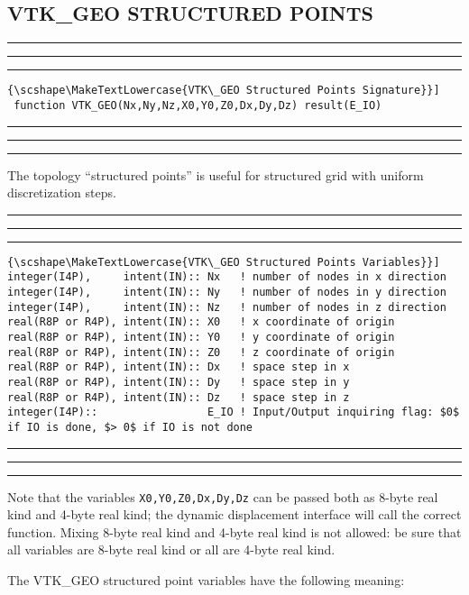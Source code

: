 \documentclass[pagesize=pdftex,fontsize=10pt,paper=a4,oneside]{scrbook}
\DeclareRobustCommand{\MarginNote}[1]{\marginpar{%
\slshape\footnotesize%
\parindent=0pt\lineskip=0pt\lineskiplimit=0pt%
\tolerance=2000\hyphenpenalty=300\exhyphenpenalty=300%
\doublehyphendemerits=100000\finalhyphendemerits=\doublehyphendemerits%
\raggedright\hspace{0pt}#1}}
\newenvironment{boxred}[1]%
               {%
                \noindent\hspace*{-0.025\textwidth}%
                \color{Maroon}%
                \rule[-5.8pt]{0.6pt}{6pt}\hspace*{-0.6pt}\rule{1.05\textwidth}{0.6pt}\hspace*{-0.6pt}\rule[-5.8pt]{0.6pt}{6pt}%
                \color{black}%
                \vspace*{0.6pt}\MarginNote{\color{Maroon}{#1}}%
               }%
               {%
                \noindent\hspace*{-0.025\textwidth}%
                \color{Maroon}%
                \rule[0pt]{0.6pt}{6pt}\hspace*{-0.6pt}\rule{1.05\textwidth}{0.6pt}\hspace*{-0.6pt}\rule[0pt]{0.6pt}{6pt}%
                \color{black}%
                \vspace*{2mm}%
               }
\newcommand{\virgo}[1]{``{#1}''}
\DeclareRobustCommand{\MaiuscolettoBS}[1]{\textls[80]{\scshape\MakeTextLowercase{#1}}}
\begin{document}
\subsection{VTK\_GEO STRUCTURED POINTS}

\begin{boxred}{}
\begin{lstlisting}[style=signature,title=\color{Maroon}\MaiuscolettoBS{VTK\_GEO Structured Points Signature}]
 function VTK_GEO(Nx,Ny,Nz,X0,Y0,Z0,Dx,Dy,Dz) result(E_IO)
\end{lstlisting}
\end{boxred}

The topology \virgo{structured points} is useful for structured grid with uniform discretization steps.

\begin{boxred}{}
\begin{lstlisting}[style=variables,title=\color{Maroon}\MaiuscolettoBS{VTK\_GEO Structured Points Variables}]
integer(I4P),     intent(IN):: Nx   ! number of nodes in x direction
integer(I4P),     intent(IN):: Ny   ! number of nodes in y direction
integer(I4P),     intent(IN):: Nz   ! number of nodes in z direction
real(R8P or R4P), intent(IN):: X0   ! x coordinate of origin
real(R8P or R4P), intent(IN):: Y0   ! y coordinate of origin
real(R8P or R4P), intent(IN):: Z0   ! z coordinate of origin
real(R8P or R4P), intent(IN):: Dx   ! space step in x
real(R8P or R4P), intent(IN):: Dy   ! space step in y
real(R8P or R4P), intent(IN):: Dz   ! space step in z
integer(I4P)::                 E_IO ! Input/Output inquiring flag: $0$ if IO is done, $> 0$ if IO is not done
\end{lstlisting}
\end{boxred}

Note that the variables \texttt{X0,Y0,Z0,Dx,Dy,Dz} can be passed both as 8-byte real kind and 4-byte real kind; the dynamic
displacement interface will call the correct function. Mixing 8-byte real kind and 4-byte real kind is not allowed: be sure
that all variables are 8-byte real kind or all are 4-byte real kind.

The VTK\_GEO structured point variables have the following meaning:
\end{document}
